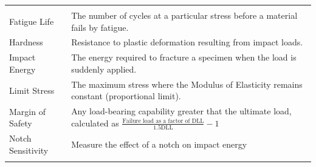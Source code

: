 \documentclass[
]{book}
\begin{document}
\begin{longtable}[]{@{}ll@{}}
\begin{minipage}[t]{0.80\columnwidth}
\end{minipage}\tabularnewline
\begin{minipage}[t]{0.14\columnwidth}\raggedright
Fatigue Life\strut
\end{minipage} & \begin{minipage}[t]{0.80\columnwidth}\raggedright
The number of cycles at a particular stress before a material fails by fatigue.\strut
\end{minipage}\tabularnewline
\begin{minipage}[t]{0.14\columnwidth}\raggedright
Hardness\strut
\end{minipage} & \begin{minipage}[t]{0.80\columnwidth}\raggedright
Resistance to plastic deformation resulting from impact loads.\strut
\end{minipage}\tabularnewline
\begin{minipage}[t]{0.14\columnwidth}\raggedright
Impact Energy\strut
\end{minipage} & \begin{minipage}[t]{0.80\columnwidth}\raggedright
The energy required to fracture a specimen when the load is suddenly applied.\strut
\end{minipage}\tabularnewline
\begin{minipage}[t]{0.14\columnwidth}\raggedright
Limit Stress\strut
\end{minipage} & \begin{minipage}[t]{0.80\columnwidth}\raggedright
The maximum stress where the Modulus of Elasticity remains constant (proportional limit).\strut
\end{minipage}\tabularnewline
\begin{minipage}[t]{0.14\columnwidth}\raggedright
Margin of Safety\strut
\end{minipage} & \begin{minipage}[t]{0.80\columnwidth}\raggedright
Any load-bearing capability greater that the ultimate load, calculated as \(\frac{\text{Failure load as a factor of } \mathrm{DLL}}{1.5 \mathrm{ DLL}} - 1\)\strut
\end{minipage}\tabularnewline
\begin{minipage}[t]{0.14\columnwidth}\raggedright
Notch Sensitivity\strut
\end{minipage} & \begin{minipage}[t]{0.80\columnwidth}\raggedright
Measure the effect of a notch on impact energy\strut
\end{minipage}\tabularnewline
\begin{minipage}[t]{0.14\columnwidth}\raggedright

\end{minipage}
\end{longtable}
\end{document}
